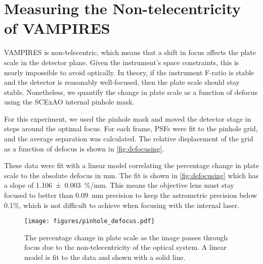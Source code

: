 \section{Measuring the Non-telecentricity of VAMPIRES}\label{sec:telecentricity}

VAMPIRES is non-telecentric, which means that a shift in focus affects the plate scale in the detector plane. Given the instrument's space constraints, this is nearly impossible to avoid optically. In theory, if the instrument F-ratio is stable and the detector is reasonably well-focused, then the plate scale should stay stable. Nonetheless, we quantify the change in plate scale as a function of defocus using the SCExAO internal pinhole mask.

For this experiment, we used the pinhole mask and moved the detector stage in steps around the optimal focus. For each frame, PSFs were fit to the pinhole grid, and the average separation was calculated. The relative displacement of the grid as a function of defocus is shown in \autoref{fig:defocusing}.

These data were fit with a linear model correlating the percentage change in plate scale to the absolute defocus in \si{\milli\meter}. The fit is shown in \autoref{fig:defocusing} which has a slope of \SI{1.106(3)}{\%/\milli\meter}. This means the objective lens must stay focused to better than \SI{0.09}{\milli\meter} precision to keep the astrometric precision below 0.1\%, which is not difficult to achieve when focusing with the internal laser.

\begin{figure}
    \centering
    \texttt{[image: figures/pinhole\_defocus.pdf]}
    \caption{The percentage change in plate scale as the image passes through focus due to the non-telecentricity of the optical system. A linear model is fit to the data and shown with a solid line.\label{fig:defocusing}}
\end{figure}
